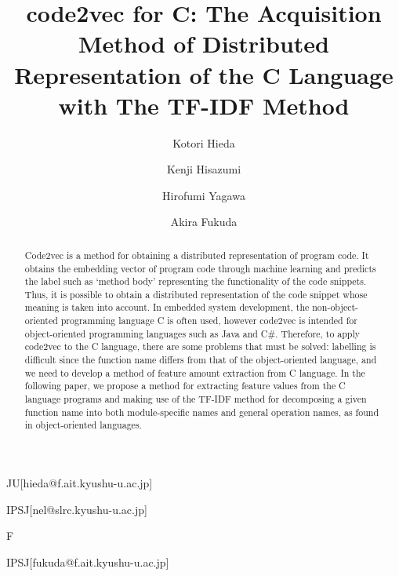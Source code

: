 \documentclass[JIP]{apris}
\begin{document}
\title{code2vec for C: The Acquisition Method of Distributed Representation of the C Language with The TF-IDF Method}


\author{Kotori Hieda}{JU}[hieda@f.ait.kyushu-u.ac.jp]
\author{Kenji Hisazumi}{IPSJ}[nel@slrc.kyushu-u.ac.jp]
\author{Hirofumi Yagawa}{F}
\author{Akira Fukuda}{IPSJ}[fukuda@f.ait.kyushu-u.ac.jp]


\begin{abstract}
Code2vec is a method for obtaining a distributed representation of program code. It obtains the embedding vector of program code through machine learning and predicts the label such as ‘method body’ representing the functionality of the code snippets. Thus, it is possible to obtain a distributed representation of the code snippet whose meaning is taken into account. In embedded system development, the non-object-oriented programming language C is often used, however code2vec is intended for object-oriented programming languages such as Java and C\#. Therefore, to apply code2vec to the C language, there are some problems that must be solved: labelling is difficult since the function name differs from that of the object-oriented language, and we need to develop a method of feature amount extraction from C language. In the following paper, we propose a method for extracting feature values from the C language programs and making use of the TF-IDF method for decomposing a given function name into both module-specific names and general operation names, as found in object-oriented languages.
\end{abstract}
\end{document}
